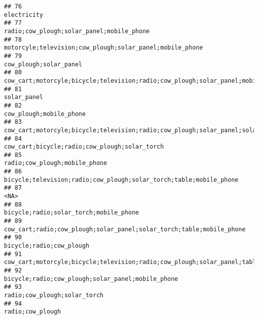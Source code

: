 \documentclass[
]{article}
\begin{document}
\begin{verbatim}
## 76                                                                                                                               electricity
## 77                                                                                                 radio;cow_plough;solar_panel;mobile_phone
## 78                                                                                  motorcyle;television;cow_plough;solar_panel;mobile_phone
## 79                                                                                                                    cow_plough;solar_panel
## 80                                                           cow_cart;motorcyle;bicycle;television;radio;cow_plough;solar_panel;mobile_phone
## 81                                                                                                                               solar_panel
## 82                                                                                                                   cow_plough;mobile_phone
## 83                                               cow_cart;motorcyle;bicycle;television;radio;cow_plough;solar_panel;solar_torch;mobile_phone
## 84                                                                                             cow_cart;bicycle;radio;cow_plough;solar_torch
## 85                                                                                                             radio;cow_plough;mobile_phone
## 86                                                                        bicycle;television;radio;cow_plough;solar_torch;table;mobile_phone
## 87                                                                                                                                      <NA>
## 88                                                                                                    bicycle;radio;solar_torch;mobile_phone
## 89                                                                      cow_cart;radio;cow_plough;solar_panel;solar_torch;table;mobile_phone
## 90                                                                                                                  bicycle;radio;cow_plough
## 91                                                     cow_cart;motorcyle;bicycle;television;radio;cow_plough;solar_panel;table;mobile_phone
## 92                                                                                         bicycle;radio;cow_plough;solar_panel;mobile_phone
## 93                                                                                                              radio;cow_plough;solar_torch
## 94                                                                                                                          radio;cow_plough

\end{verbatim}
\end{document}
